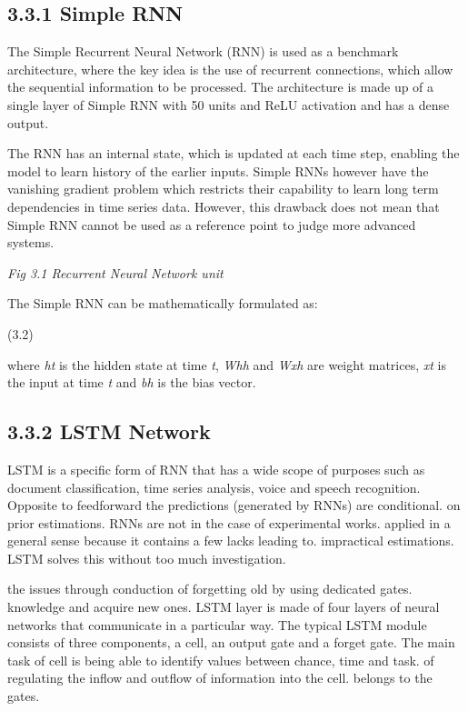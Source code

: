 \documentclass[12pt,a4paper]{report}
\begin{document}
\subsection{3.3.1 Simple RNN}
The Simple Recurrent Neural Network (RNN) is used as a benchmark architecture, where the key idea is the use of recurrent connections, which allow the sequential information to be processed. The architecture is made up of a single layer of Simple RNN with 50 units and ReLU activation and has a dense output.

The RNN has an internal state, which is updated at each time step, enabling the model to learn history of the earlier inputs. Simple RNNs however have the vanishing gradient problem which restricts their capability to learn long term dependencies in time series data. However, this drawback does not mean that Simple RNN cannot be used as a reference point to judge more advanced systems.

\begin{center}
\textit{Fig 3.1 Recurrent Neural Network unit}
\end{center}
The Simple RNN can be mathematically formulated as: 

								(3.2)

where \textit{h}\textit{t}\textit{ }is the hidden state at time \textit{t}, \textit{W}\textit{h}\textit{h}\textit{ }and \textit{W}\textit{x}\textit{h} are weight matrices, \textit{x}\textit{t} is the input at time\textit{ t }and \textit{b}\textit{h} is the bias vector.

\subsection{3.3.2 LSTM Network}
LSTM is a specific form of RNN that has a wide scope of purposes such as document classification, time series analysis, voice and speech recognition. Opposite to feedforward the predictions (generated by RNNs) are conditional. on prior estimations. RNNs are not in the case of experimental works. applied in a general sense because it contains a few lacks leading to. impractical estimations. LSTM solves this without too much investigation.

the issues through conduction of forgetting old by using dedicated gates. knowledge and acquire new ones. LSTM layer is made of four layers of neural networks that communicate in a particular way. The typical LSTM module consists of three components, a cell, an output gate and a forget gate. The main task of cell is being able to identify values between chance, time and task. of regulating the inflow and outflow of information into the cell. belongs to the gates.
\end{document}
